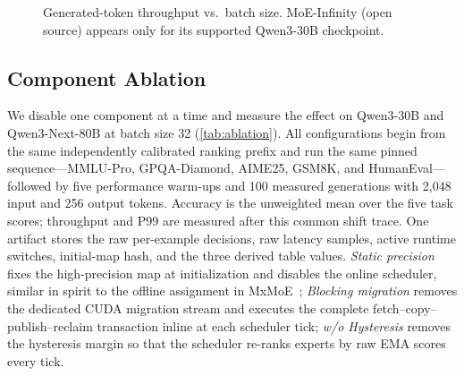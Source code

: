 \begin{figure}[t]
    \centering
    \begin{minipage}{0.32\linewidth}
        \centering
    \end{minipage}
    \begin{minipage}{0.32\linewidth}
        \centering
    \end{minipage}
    \begin{minipage}{0.32\linewidth}
        \centering
    \end{minipage}
    \caption{Generated-token throughput vs.\ batch size. MoE-Infinity (open source) appears only for its supported Qwen3-30B checkpoint.}
    \label{fig:throughput}
    \vspace{-1em}
\end{figure}

\subsection{Component Ablation}
\label{sec:eval-ablation}

We disable one component at a time and measure the effect on Qwen3-30B and Qwen3-Next-80B at batch size 32 (\autoref{tab:ablation}). All configurations begin from the same independently calibrated ranking prefix and run the same pinned sequence---MMLU-Pro, GPQA-Diamond, AIME25, GSM8K, and HumanEval---followed by five performance warm-ups and 100 measured generations with 2,048 input and 256 output tokens. Accuracy is the unweighted mean over the five task scores; throughput and P99 are measured after this common shift trace. One artifact stores the raw per-example decisions, raw latency samples, active runtime switches, initial-map hash, and the three derived table values.
\emph{Static precision} fixes the high-precision map at initialization and disables the online scheduler, similar in spirit to the offline assignment in MxMoE~\cite{duanmu2025mxmoe};
\emph{Blocking migration} removes the dedicated CUDA migration stream and executes the complete fetch--copy--publish--reclaim transaction inline at each scheduler tick;
\emph{w/o Hysteresis} removes the hysteresis margin so that the scheduler re-ranks experts by raw EMA scores every tick.

